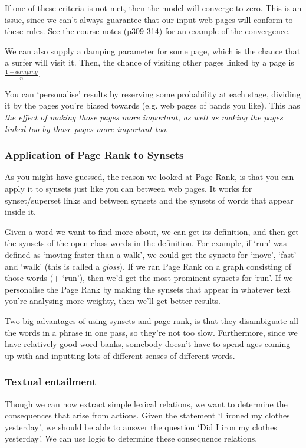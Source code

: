 If one of these criteria is not met, then the model will converge to zero. This
is an issue, since we can't always guarantee that our input web pages will
conform to these rules. See the course notes (p309-314) for an example of the
convergence.

We can also supply a damping parameter for some page, which is the chance that a
surfer will visit it. Then, the chance of visiting other pages linked by a page
is $\frac{1 - damping}{n}$.

You can `personalise' results by reserving some probability at each stage,
dividing it by the pages you're biased towards (e.g. web pages of bands you
like). This has \textit{the effect of making those pages more important, as well
as making the pages linked too by those pages more important too}.

\subsubsection{Application of Page Rank to Synsets}

As you might have guessed, the reason we looked at Page Rank, is that you can
apply it to synsets just like you can between web pages. It works for
synset/superset links and between synsets and the synsets of words that appear
inside it.

Given a word we want to find more about, we can get its definition, and then get
the synsets of the open class words in the definition. For example, if `run' was
defined as `moving faster than a walk', we could get the synsets for `move',
`fast' and `walk' (this is called a \textit{gloss}). If we ran Page Rank on a
graph consisting of those words (+ `run'), then we'd get the most prominent
synsets for `run'. If we personalise the Page Rank by making the synsets that
appear in whatever text you're analysing more weighty, then we'll get better
results.

Two big advantages of using synsets and page rank, is that they disambiguate all
the words in a phrase in one pass, so they're not too slow. Furthermore, since
we have relatively good word banks, somebody doesn't have to spend ages coming
up with and inputting lots of different senses of different words.

\subsubsection{Textual entailment}

Though we can now extract simple lexical relations, we want to determine the
consequences that arise from actions. Given the statement `I ironed my clothes
yesterday', we should be able to answer the question `Did I iron my clothes
yesterday'. We can use logic to determine these consequence relations.

